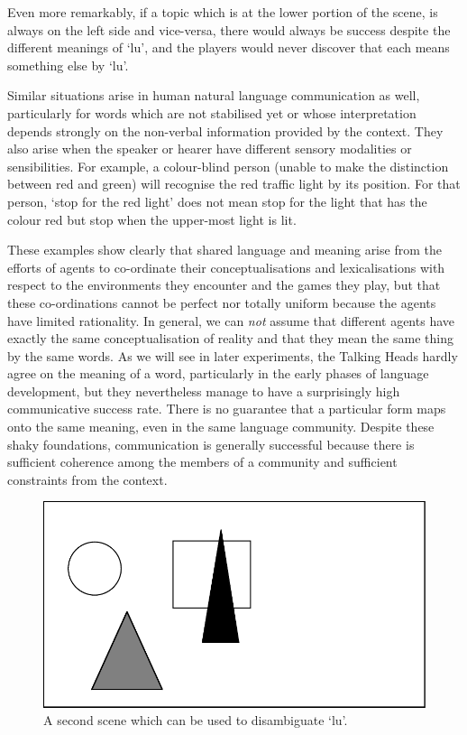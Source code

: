 \clearpage
Even more remarkably, if a topic which is at the lower
portion of the scene, is always 
on the left side and vice-versa, there would always be 
success despite the different meanings of `lu', 
and the players would never discover
that each means something else by `lu'. 

Similar situations arise in human natural language communication
as well, particularly for words
which are not stabilised yet or whose interpretation 
depends strongly on the non-verbal information provided
by the context. They also arise when the speaker or hearer
have different sensory modalities or sensibilities. 
For example, a colour-blind person (unable to 
make the distinction between red and green) will recognise
the red traffic light by its position. For that person, 
`stop for the red light' does not mean stop for 
the light that has the colour red but stop when the 
upper-most light is lit. 

These examples show clearly that shared language and meaning 
arise from the efforts of agents to co-ordinate their
conceptualisations and lexicalisations with respect 
to the environments they encounter and the games they play, 
but that these co-ordinations cannot be perfect nor totally 
uniform because the agents have limited rationality. 
In general, we can {\itshape not} assume that different agents
have exactly the same 
conceptualisation of reality and that they mean the same thing by 
the same words. As we will see in later experiments, the
Talking Heads hardly agree on the meaning of a word, particularly 
in the early phases of language development, but they 
nevertheless manage to have a surprisingly high communicative success
rate. There is no guarantee that a particular 
form maps onto the same meaning, even in the same language community.
Despite these shaky foundations, communication is generally 
successful because there is sufficient coherence among the members of 
a community and sufficient constraints from the context. 


\begin{figure}[htbp]
  \centerline{\includegraphics[width=.50\textwidth]{chap2/figs/scene1-2.pdf}}
\caption{\label{scene1-2}A second scene which 
can be used to disambiguate `lu'.}
\end{figure}

